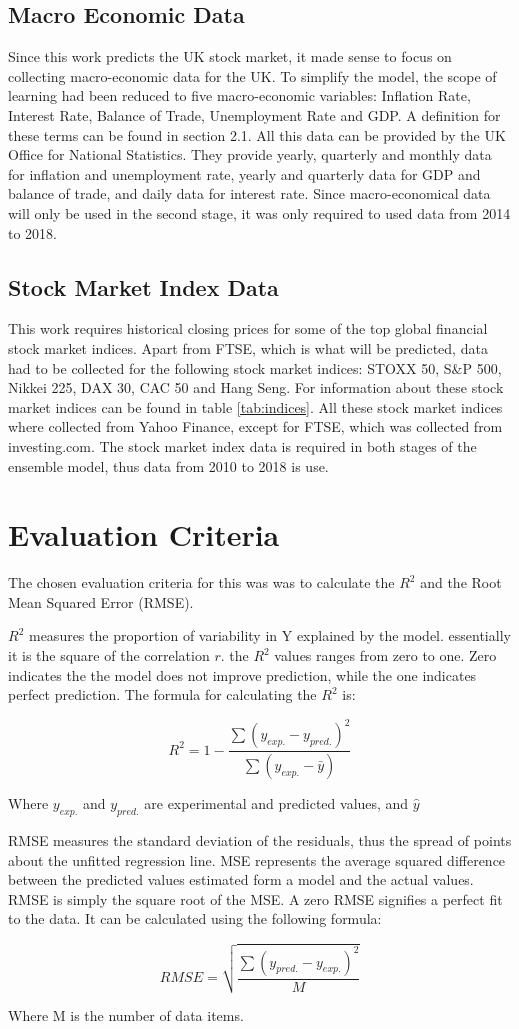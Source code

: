 \documentclass{UoYCSproject}
\begin{document}
\subsection{Macro Economic Data}
Since this work predicts the UK stock market, it made sense to focus on collecting macro-economic data for the UK. To simplify the model, the scope of learning had been reduced to five macro-economic variables: Inflation Rate, Interest Rate, Balance of Trade, Unemployment Rate and GDP. A definition for these terms can be found in section 2.1. All this data can be provided by the UK Office for National Statistics. They provide yearly, quarterly and monthly data for inflation and unemployment rate, yearly and quarterly data for GDP and balance of trade, and daily data for interest rate. Since macro-economical data will only be used in the second stage, it was only required to used data from 2014 to 2018. 

\subsection{Stock Market Index Data}
This work requires historical closing prices for some of the top global financial stock market indices. Apart from FTSE, which is what will be predicted, data had to be collected for the following stock market indices: STOXX 50, S\&P 500, Nikkei 225, DAX 30, CAC 50 and Hang Seng. For information about these stock market indices can be found in table \ref{tab:indices}. All these stock market indices where collected from Yahoo Finance, except for FTSE, which was collected from investing.com. The stock market index data is required in both stages of the ensemble model, thus data from 2010 to 2018 is use. 

\section{Evaluation Criteria}
The chosen evaluation criteria for this was was to calculate the $R^2$ and the Root Mean Squared Error (RMSE).

$R^2$ measures the proportion of variability in Y explained by the model. essentially it is the square of the correlation $r$. the $R^2$ values ranges from zero to one. Zero indicates the the model does not improve prediction, while the one indicates perfect prediction. The formula for calculating the $R^2$ is:

$$ R^2 = 1 - \frac{\sum (y_{exp.} - y_{pred.})^2}{\sum (y_{exp.} - \bar{y})} $$

Where $y_{exp.}$ and $y_{pred.}$ are experimental and predicted values, and $\hat{y}$

RMSE measures the standard deviation of the residuals, thus the spread of points about the unfitted regression line. MSE represents the average squared difference between the predicted values estimated form a model and the actual values. RMSE is simply the square root of the MSE. A zero RMSE signifies a perfect fit to the data. It can be calculated using the following formula:

$$ RMSE = \sqrt{\frac{\sum (y_{pred.} - y_{exp.}) ^ 2}{M}}$$

Where M is the number of data items. 

\printbibliography
\end{document}
